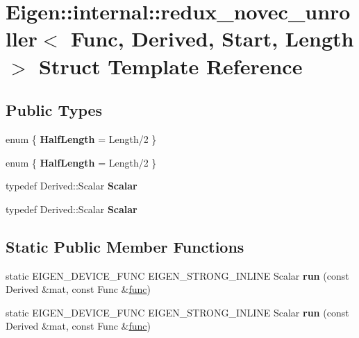 \hypertarget{struct_eigen_1_1internal_1_1redux__novec__unroller}{}\section{Eigen\+:\+:internal\+:\+:redux\+\_\+novec\+\_\+unroller$<$ Func, Derived, Start, Length $>$ Struct Template Reference}
\label{struct_eigen_1_1internal_1_1redux__novec__unroller}
\subsection*{Public Types}
\begin{DoxyCompactItemize}
\item 
\mbox{\label{struct_eigen_1_1internal_1_1redux__novec__unroller_a6d02da6b17487e026f050f588ef0011a}} 
enum \{ {\bfseries Half\+Length} = Length/2
 \}
\item 
\mbox{\label{struct_eigen_1_1internal_1_1redux__novec__unroller_a29802586b72ce996c3933aa61776c5dd}} 
enum \{ {\bfseries Half\+Length} = Length/2
 \}
\item 
\mbox{\label{struct_eigen_1_1internal_1_1redux__novec__unroller_a77060572615dfca306cf2ee47ebe722d}} 
typedef Derived\+::\+Scalar {\bfseries Scalar}
\item 
\mbox{\label{struct_eigen_1_1internal_1_1redux__novec__unroller_a77060572615dfca306cf2ee47ebe722d}} 
typedef Derived\+::\+Scalar {\bfseries Scalar}
\end{DoxyCompactItemize}
\subsection*{Static Public Member Functions}
\begin{DoxyCompactItemize}
\item 
\mbox{\label{struct_eigen_1_1internal_1_1redux__novec__unroller_aa83c93f6cbbd592b9b96f7e7ad62fb90}} 
static E\+I\+G\+E\+N\+\_\+\+D\+E\+V\+I\+C\+E\+\_\+\+F\+U\+NC E\+I\+G\+E\+N\+\_\+\+S\+T\+R\+O\+N\+G\+\_\+\+I\+N\+L\+I\+NE Scalar {\bfseries run} (const Derived \&mat, const Func \&\hyperlink{structfunc}{func})
\item 
\mbox{\label{struct_eigen_1_1internal_1_1redux__novec__unroller_aa83c93f6cbbd592b9b96f7e7ad62fb90}} 
static E\+I\+G\+E\+N\+\_\+\+D\+E\+V\+I\+C\+E\+\_\+\+F\+U\+NC E\+I\+G\+E\+N\+\_\+\+S\+T\+R\+O\+N\+G\+\_\+\+I\+N\+L\+I\+NE Scalar {\bfseries run} (const Derived \&mat, const Func \&\hyperlink{structfunc}{func})
\end{DoxyCompactItemize}


